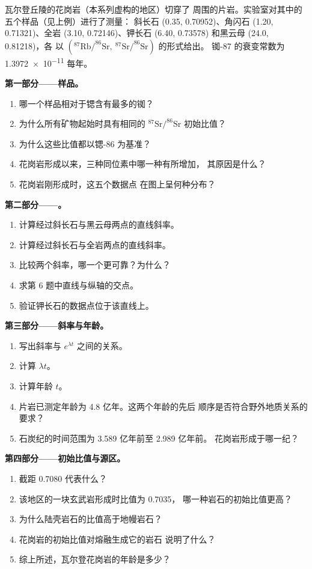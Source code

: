 \begin{problem}
\label{pb:g12:age-of-the-earth:1}
瓦尔登丘陵的花岗岩（本系列虚构的地区）切穿了
周围的片岩。实验室对其中的五个样品（见上例）进行了测量：
斜长石 (0.35, 0.70952)、角闪石 (1.20, 0.71321)、全岩 (3.10,
0.72146)、钾长石 (6.40, 0.73578) 和黑云母 (24.0, 0.81218)，各
以 $(^{87}\mathrm{Rb}/^{86}\mathrm{Sr},\ ^{87}\mathrm{Sr}/^{86}\mathrm{Sr})$ 的形式给出。
铷-87 的衰变常数为 \num{1.3972e-11} 每年。

\medskip
\noindent\textbf{第一部分——样品。}
\begin{enumerate}
  \item 哪一个样品相对于锶含有最多的铷？
  \item 为什么所有矿物起始时具有相同的
        $^{87}\mathrm{Sr}/^{86}\mathrm{Sr}$ 初始比值？
  \item 为什么这些比值都以锶-86 为基准？
  \item 花岗岩形成以来，三种同位素中哪一种有所增加，
        其原因是什么？
  \item 花岗岩刚形成时，这五个数据点
        在图上呈何种分布？
\end{enumerate}

\medskip
\noindent\textbf{第二部分——。}
\begin{enumerate}[resume]
  \item 计算经过斜长石与黑云母两点的直线斜率。
  \item 计算经过斜长石与全岩两点的直线斜率。
  \item 比较两个斜率，哪一个更可靠？为什么？
  \item 求第 6 题中直线与纵轴的交点。
  \item 验证钾长石的数据点位于该直线上。
\end{enumerate}

\medskip
\noindent\textbf{第三部分——斜率与年龄。}
\begin{enumerate}[resume]
  \item 写出斜率与 $e^{\lambda t}$ 之间的关系。
  \item 计算 $\lambda t$。
  \item 计算年龄 $t$。
  \item 片岩已测定年龄为 4.8 亿年。这两个年龄的先后
        顺序是否符合野外地质关系的要求？
  \item 石炭纪的时间范围为 3.589 亿年前至 2.989 亿年前。
        花岗岩形成于哪一纪？
\end{enumerate}

\medskip
\noindent\textbf{第四部分——初始比值与源区。}
\begin{enumerate}[resume]
  \item 截距 0.7080 代表什么？
  \item 该地区的一块玄武岩形成时比值为 0.7035，
        哪一种岩石的初始比值更高？
  \item 为什么陆壳岩石的比值高于地幔岩石？
  \item 花岗岩的初始比值对熔融生成它的岩石
        说明了什么？
  \item 综上所述，瓦尔登花岗岩的年龄是多少？
\end{enumerate}
\end{problem}
